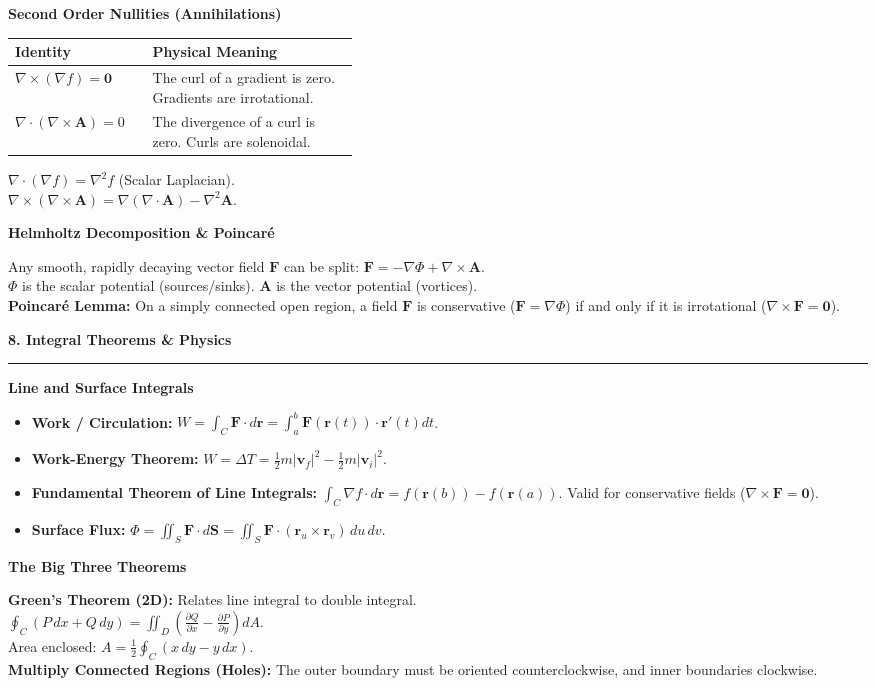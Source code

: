 \documentclass[10pt, landscape, twocolumn]{article}
\newcommand{\cheatsheetsection}[1]{
    \vspace{0.8em}
    {\color{themeblue}\large\bfseries #1} \par
    \vspace{-0.4em}
    {\color{themeblue}\rule{\linewidth}{1pt}} \par
    \vspace{0.3em}
}
\newcommand{\cheatsheetsubsection}[1]{
    \vspace{0.5em}
    {\color{themeblue}\normalsize\bfseries #1} \par
    \vspace{0.2em}
}
\begin{document}
\cheatsheetsubsection{Second Order Nullities (Annihilations)}
\begin{tabularx}{\linewidth}{|p{0.4\linewidth}|X|}
\hline
\textbf{Identity} & \textbf{Physical Meaning} \\ \hline
$\nabla \times (\nabla f) = \mathbf{0}$ & The curl of a gradient is zero. Gradients are irrotational. \\ \hline
$\nabla \cdot (\nabla \times \mathbf{A}) = 0$ & The divergence of a curl is zero. Curls are solenoidal. \\ \hline
\end{tabularx}
$\nabla \cdot (\nabla f) = \nabla^2 f$ (Scalar Laplacian). \\
$\nabla \times (\nabla \times \mathbf{A}) = \nabla(\nabla \cdot \mathbf{A}) - \nabla^2 \mathbf{A}$.

\cheatsheetsubsection{Helmholtz Decomposition \& Poincaré}
Any smooth, rapidly decaying vector field $\mathbf{F}$ can be split: $\mathbf{F} = -\nabla \Phi + \nabla \times \mathbf{A}$. \\
$\Phi$ is the scalar potential (sources/sinks). $\mathbf{A}$ is the vector potential (vortices). \\
\textbf{Poincaré Lemma:} On a simply connected open region, a field $\mathbf{F}$ is conservative ($\mathbf{F} = \nabla \Phi$) if and only if it is irrotational ($\nabla \times \mathbf{F} = \mathbf{0}$).

\cheatsheetsection{8. Integral Theorems \& Physics}

\cheatsheetsubsection{Line and Surface Integrals}
\begin{itemize}[leftmargin=*, nosep]
    \item \textbf{Work / Circulation:} $W = \int_C \mathbf{F} \cdot d\mathbf{r} = \int_a^b \mathbf{F}(\mathbf{r}(t)) \cdot \mathbf{r}'(t) dt$.
    \item \textbf{Work-Energy Theorem:} $W = \Delta T = \frac{1}{2}m|\mathbf{v}_f|^2 - \frac{1}{2}m|\mathbf{v}_i|^2$.
    \item \textbf{Fundamental Theorem of Line Integrals:} $\int_C \nabla f \cdot d\mathbf{r} = f(\mathbf{r}(b)) - f(\mathbf{r}(a))$. Valid for conservative fields ($\nabla \times \mathbf{F} = \mathbf{0}$).
    \item \textbf{Surface Flux:} $\Phi = \iint_S \mathbf{F} \cdot d\mathbf{S} = \iint_S \mathbf{F} \cdot (\mathbf{r}_u \times \mathbf{r}_v) \, du \, dv$.
\end{itemize}

\cheatsheetsubsection{The Big Three Theorems}
\textbf{Green's Theorem (2D):} Relates line integral to double integral. \\
$\oint_C (P\,dx + Q\,dy) = \iint_D \left(\frac{\partial Q}{\partial x} - \frac{\partial P}{\partial y}\right) dA$. \\
Area enclosed: $A = \frac{1}{2} \oint_C (x\,dy - y\,dx)$. \\
\textbf{Multiply Connected Regions (Holes):} The outer boundary must be oriented counterclockwise, and inner boundaries clockwise.
\end{document}

